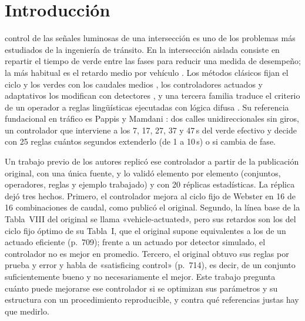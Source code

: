 \documentclass[journal]{IEEEtran}
\begin{document}
\section{Introducción}
\label{sec:intro}

 control de las señales luminosas de una intersección es uno de los problemas más estudiados de la ingeniería de tránsito. En la intersección aislada consiste en repartir el tiempo de verde entre las fases para reducir una medida de desempeño; la más habitual es el retardo medio por vehículo \cite{Pappis1977,Papageorgiou2003}. Los métodos clásicos fijan el ciclo y los verdes con los caudales medios \cite{Webster1958,Webster1966,Miller1963,Allsop1971}, los controladores actuados y adaptativos los modifican con detectores \cite{Hunt1982,Lowrie1982,Mirchandani2001}, y una tercera familia traduce el criterio de un operador a reglas lingüísticas ejecutadas con lógica difusa \cite{Zadeh1965,Zadeh1973,MamdaniAssilian1975}. Su referencia fundacional en tráfico es Pappis y Mamdani \cite{Pappis1977}: dos calles unidireccionales sin giros, un controlador que interviene a los 7, 17, 27, 37 y 47\,s del verde efectivo y decide con 25 reglas cuántos segundos extenderlo (de 1 a 10\,s) o si cambia de fase.

Un trabajo previo de los autores replicó ese controlador a partir de la publicación original, con una única fuente, y lo validó elemento por elemento (conjuntos, operadores, reglas y ejemplo trabajado) y con 20 réplicas estadísticas. La réplica dejó tres hechos. Primero, el controlador mejora al ciclo fijo de Webster en 16 de 16 combinaciones de caudal, como publicó el original. Segundo, la línea base de la Tabla~VIII del original se llama «vehicle-actuated», pero sus retardos son los del ciclo fijo óptimo de su Tabla~I, que el original supone equivalentes a los de un actuado eficiente (p.~709); frente a un actuado por detector simulado, el controlador no es mejor en promedio. Tercero, el original obtuvo sus reglas por prueba y error y habla de «satisficing control» (p.~714), es decir, de un conjunto suficientemente bueno y no necesariamente el mejor. Este trabajo pregunta cuánto puede mejorarse ese controlador si se optimizan sus parámetros y su estructura con un procedimiento reproducible, y contra qué referencias justas hay que medirlo.
\end{document}
